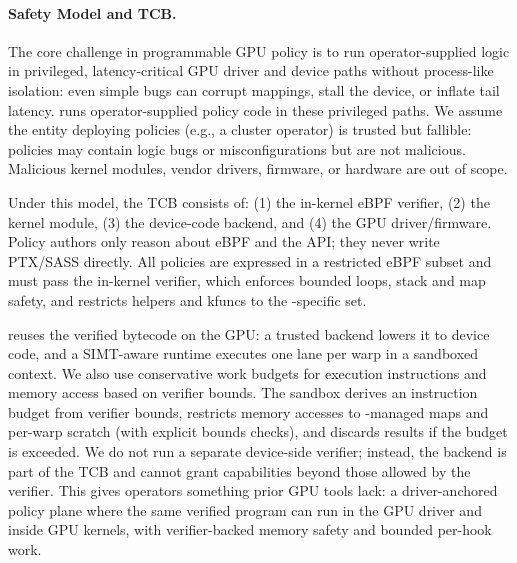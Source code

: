 \paragraph{Safety Model and TCB.}
The core challenge in programmable GPU policy is to run operator-supplied logic in privileged, latency-critical GPU driver and device paths without process-like isolation: even simple bugs can corrupt mappings, stall the device, or inflate tail latency. \sys runs operator-supplied policy code in these privileged paths. We assume the entity deploying \sys policies (e.g., a cluster operator) is trusted but fallible: policies may contain logic bugs or misconfigurations but are not malicious. Malicious kernel modules, vendor drivers, firmware, or hardware are out of scope.

Under this model, the \sys TCB consists of: (1) the in-kernel eBPF verifier, (2) the \sys kernel module, (3) the device-code backend, and (4) the GPU driver/firmware. Policy authors only reason about eBPF and the \sys API; they never write PTX/SASS directly. All policies are expressed in a restricted eBPF subset and must pass the in-kernel verifier, which enforces bounded loops, stack and map safety, and restricts helpers and kfuncs to the \sys-specific set.

\sys reuses the verified bytecode on the GPU: a trusted backend lowers it to device code, and a SIMT-aware runtime executes one lane per warp in a sandboxed context. We also use conservative work budgets for execution instructions and memory access based on verifier bounds. The sandbox derives an instruction budget from verifier bounds, restricts memory accesses to \sys-managed maps and per-warp scratch (with explicit bounds checks), and discards results if the budget is exceeded. We do not run a separate device-side verifier; instead, the backend is part of the TCB and cannot grant capabilities beyond those allowed by the verifier. This gives operators something prior GPU tools lack: a driver-anchored policy plane where the same verified program can run in the GPU driver and inside GPU kernels, with verifier-backed memory safety and bounded per-hook work.



